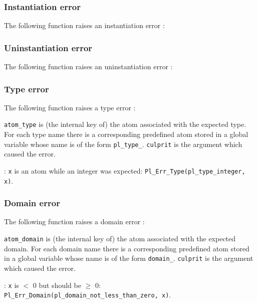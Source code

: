 \subsubsection{Instantiation error}
The following function raises an instantiation error :


\subsubsection{Uninstantiation error}
The following function raises an uninstantiation error :


\subsubsection{Type error}
The following function raises a type error :


\texttt{atom\_type} is (the internal key of) the atom associated with the
expected type. For each type name  there is a
corresponding predefined atom stored in a global variable whose name is of
the form \texttt{pl\_type\_}. \texttt{culprit} is the argument which
caused the error.

: \texttt{x} is an atom while an integer was expected:
\texttt{Pl\_Err\_Type(pl\_type\_integer, x)}.

\subsubsection{Domain error}
The following function raises a domain error :


\texttt{atom\_domain} is (the internal key of) the atom associated with the
expected domain. For each domain name  there is a
corresponding predefined atom stored in a global variable whose name is of
the form \texttt{domain\_}. \texttt{culprit} is the argument which
caused the error.

: \texttt{x} is $<$ 0 but should be $\geq$ 0:
\texttt{Pl\_Err\_Domain(pl\_domain\_not\_less\_than\_zero, x)}.

